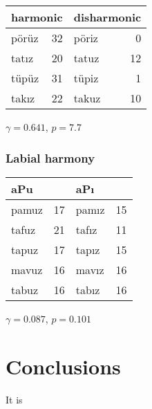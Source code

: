 \begin{example}
\begin{tabular}{l r l r}
\toprule
\multicolumn{2}{l}{harmonic} & \multicolumn{2}{l}{disharmonic} \\
\midrule
{pörüz} & 32            & {pöriz} & 0  \\
{tatız} & 20            & {tatuz} & 12 \\
{tüpüz} & 31            & {tüpiz} & 1  \\
{takız} & 22            & {takuz} & 10 \\
\bottomrule
\end{tabular}
\end{example}

$\gamma = 0.641$, $p = 7.7$


\subsubsection{Labial harmony}

\begin{example}
\begin{tabular}{l r l r}
\toprule
\multicolumn{2}{l}{{a}P{u}} & \multicolumn{2}{l}{{a}P{ı}} \\
\midrule
{pamuz} & 17       & {pamız} & 15 \\
{tafuz} & 21       & {tafız} & 11 \\
{tapuz} & 17       & {tapız} & 15 \\
{mavuz} & 16       & {mavız} & 16 \\
{tabuz} & 16       & {tabız} & 16 \\
\bottomrule
\end{tabular}
\end{example}

$\gamma = 0.087$, $p = 0.101$

\section{Conclusions}

\citet{Becker2011}

It is 

